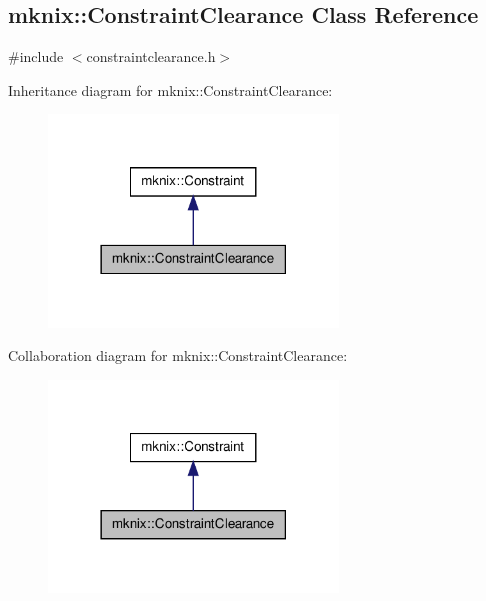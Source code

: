 \hypertarget{classmknix_1_1_constraint_clearance}{\subsection{mknix\-:\-:Constraint\-Clearance Class Reference}
\label{classmknix_1_1_constraint_clearance}
}


{\ttfamily \#include $<$constraintclearance.\-h$>$}



Inheritance diagram for mknix\-:\-:Constraint\-Clearance\-:\nopagebreak
\begin{figure}[H]
\begin{center}
\leavevmode
\includegraphics[width=218pt]{df/d57/classmknix_1_1_constraint_clearance__inherit__graph}
\end{center}
\end{figure}


Collaboration diagram for mknix\-:\-:Constraint\-Clearance\-:\nopagebreak
\begin{figure}[H]
\begin{center}
\leavevmode
\includegraphics[width=218pt]{de/d1a/classmknix_1_1_constraint_clearance__coll__graph}
\end{center}
\end{figure}

